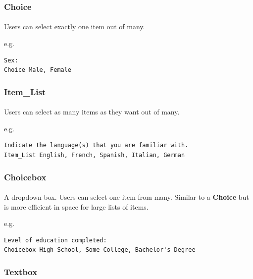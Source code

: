 \documentclass[12pt, oneside]{scrbook}   	%
\begin{document}
\subsubsection{Choice}

\paragraph{}
Users can select exactly one item out of many.

e.g.

\begin{lstlisting}
Sex:
Choice Male, Female
\end{lstlisting}

\subsubsection{Item\_List}

\paragraph{}
Users can select as many items as they want out of many.

e.g.

\begin{lstlisting}
Indicate the language(s) that you are familiar with.
Item_List English, French, Spanish, Italian, German
\end{lstlisting}

\subsubsection{Choicebox}

\paragraph{}
A dropdown box.  Users can select one item from many.  Similar to a \textbf{Choice} but is more efficient in space for large lists of items.

e.g.

\begin{lstlisting}
Level of education completed:
Choicebox High School, Some College, Bachelor's Degree
\end{lstlisting}

\subsubsection{Textbox}
\end{document}
